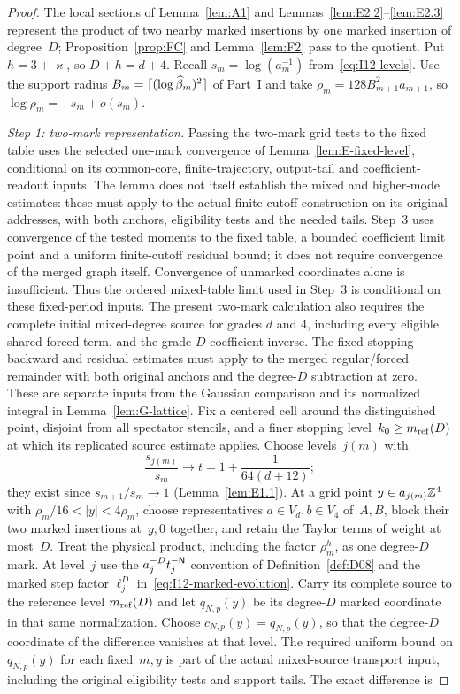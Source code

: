 \begin{proof}
The local sections of Lemma~\ref{lem:A1} and Lemmas~\ref{lem:E2.2}--\ref{lem:E2.3} represent the product of two nearby marked insertions by one marked insertion of degree~$D$; Proposition~\ref{prop:FC} and Lemma~\ref{lem:F2} pass to the quotient. Put $h=3+\varkappa$, so $D+h=d+4$. Recall $s_m=\log(a_m^{-1})$ from~\eqref{eq:I12-levels}. Use the support radius $B_m=\lceil(\log\widehat{\beta}_m)^2\rceil$ of Part~I and take $\rho_m=128B_{m+1}^2a_{m+1}$, so $\log\rho_m=-s_m+o(s_m)$.

\emph{Step 1: two-mark representation.} Passing the two-mark grid tests to the fixed table uses the selected one-mark convergence of Lemma~\ref{lem:E-fixed-level}, conditional on its common-core, finite-trajectory, output-tail and coefficient-readout inputs. The lemma does not itself establish the mixed and higher-mode estimates: these must apply to the actual finite-cutoff construction on its original addresses, with both anchors, eligibility tests and the needed tails. Step~3 uses convergence of the tested moments to the fixed table, a bounded coefficient limit point and a uniform finite-cutoff residual bound; it does not require convergence of the merged graph itself. Convergence of unmarked coordinates alone is insufficient. Thus the ordered mixed-table limit used in Step~3 is conditional on these fixed-period inputs. The present two-mark calculation also requires the complete initial mixed-degree source for grades $d$ and $4$, including every eligible shared-forced term, and the grade-$D$ coefficient inverse. The fixed-stopping backward and residual estimates must apply to the merged regular/forced remainder with both original anchors and the degree-$D$ subtraction at zero. These are separate inputs from the Gaussian comparison and its normalized integral in Lemma~\ref{lem:G-lattice}. Fix a centered cell around the distinguished point, disjoint from all spectator stencils, and a finer stopping level~$k_0\ge m_{\mathrm{ref}}(D)$ at which its replicated source estimate applies. Choose levels~$j(m)$ with
\begin{equation*}
\frac{s_{j(m)}}{s_m}\longrightarrow t=1+\frac1{64(d+12)};
\end{equation*}
they exist since $s_{m+1}/s_m\to1$ (Lemma~\ref{lem:E1.1}). At a grid point $y\in a_{j(m)}\mathbb{Z}^4$ with $\rho_m/16<|y|<4\rho_m$, choose representatives $a\in V_d,b\in V_4$ of~$A,B$, block their two marked insertions at~$y,0$ together, and retain the Taylor terms of weight at most~$D$. Treat the physical product, including the factor $\rho_m^h$, as one degree-$D$ mark. At level~$j$ use the $a_j^{-D}t_j^{-\mathsf{N}}$ convention of Definition~\ref{def:D08} and the marked step factor $\ell_j^D$ in~\eqref{eq:I12-marked-evolution}. Carry its complete source to the reference level $m_{\mathrm{ref}}(D)$ and let $q_{N,p}(y)$ be its degree-$D$ marked coordinate in that same normalization. Choose $c_{N,p}(y)=q_{N,p}(y)$, so that the degree-$D$ coordinate of the difference vanishes at that level. The required uniform bound on $q_{N,p}(y)$ for each fixed~$m,y$ is part of the actual mixed-source transport input, including the original eligibility tests and support tails. The exact difference is

\end{proof}

